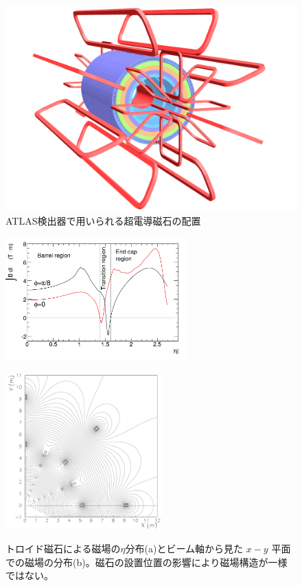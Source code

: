 \begin{figure}[tb]
  \centering
  \includegraphics[clip, width=14cm]{fig/2/ATLcoilGeom.pdf}
  \caption{ATLAS検出器で用いられる超電導磁石の配置}
  \label{fig:磁石}
\end{figure}

\begin{figure}
    \centering
    \begin{minipage}[b]{0.4\linewidth}
        \centering
        \includegraphics[clip, width=7cm]{fig/2/IBdl.pdf}
        \vspace{10pt}
        \subcaption{}
        \label{fig:磁場eta}
    \end{minipage}
    \hfill
    \begin{minipage}[b]{0.5\linewidth}
        \centering
        \includegraphics[clip, width=6cm]{fig/2/FMBmap.pdf}
        \vspace{10pt}
        \subcaption{}
        \label{fig:磁場平面}
    \end{minipage}
    \caption{トロイド磁石による磁場の$\eta$分布(a)とビーム軸から見た $x − y$ 平面での磁場の分布(b)。磁石の設置位置の影響により磁場構造が一様ではない。}
    \label{fig:磁場}
\end{figure}




